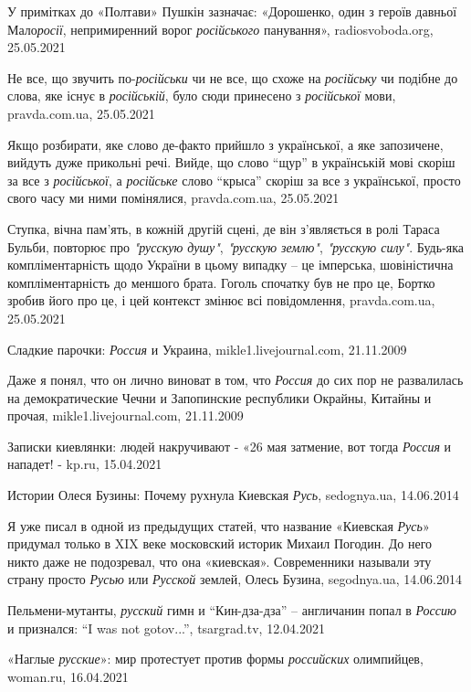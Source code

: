 У примітках до «Полтави» Пушкін зазначає: «Дорошенко, один з героїв давньої
Мало\emph{росії}, непримиренний ворог \emph{російського} панування»,
radiosvoboda.org, 25.05.2021

Не все, що звучить по-\emph{російськи} чи не все, що схоже на \emph{російську}
чи подібне до слова, яке існує в \emph{російській}, було сюди принесено з
\emph{російської} мови, pravda.com.ua, 25.05.2021

Якщо розбирати, яке слово де-факто прийшло з української, а яке запозичене,
вийдуть дуже прикольні речі. Вийде, що слово \enquote{щур} в українській мові скоріш за
все з \emph{російської}, а \emph{російське} слово \enquote{крыса} скоріш за все з української, просто
свого часу ми ними помінялися, pravda.com.ua, 25.05.2021

Ступка, вічна пам'ять, в кожній другій сцені, де він з'являється в ролі Тараса
Бульби, повторює про \emph{"русскую душу"}, \emph{"русскую землю"},
\emph{"русскую силу"}. Будь-яка компліментарність щодо України в цьому випадку
– це імперська, шовіністична компліментарність до меншого брата. Гоголь
спочатку був не про це, Бортко зробив його про це, і цей контекст змінює всі
повідомлення, pravda.com.ua, 25.05.2021

Сладкие парочки: \emph{Россия} и Украина, mikle1.livejournal.com, 21.11.2009

Даже я понял, что он лично виноват в том, что \emph{Россия} до сих пор не
развалилась на демократические Чечни и Запопинские республики Окрайны, Китайны
и прочая, mikle1.livejournal.com, 21.11.2009

Записки киевлянки: людей накручивают - «26 мая затмение, вот тогда
\emph{Россия} и нападет! - kp.ru, 15.04.2021

Истории Олеся Бузины: Почему рухнула Киевская \emph{Русь}, sedognya.ua, 14.06.2014

Я уже писал в одной из предыдущих статей, что название «Киевская \emph{Русь}»
придумал только в XIX веке московский историк Михаил Погодин. До него никто
даже не подозревал, что она «киевская». Современники называли эту страну просто
\emph{Русью} или \emph{Русской} землей, Олесь Бузина, segodnya.ua, 14.06.2014

Пельмени-мутанты, \emph{русский} гимн и \enquote{Кин-дза-дза} – англичанин
попал в \emph{Россию} и признался: \enquote{I was not gotov...}, tsargrad.tv,
12.04.2021

«Наглые \emph{русские}»: мир протестует против формы \emph{российских}
олимпийцев, woman.ru, 16.04.2021

